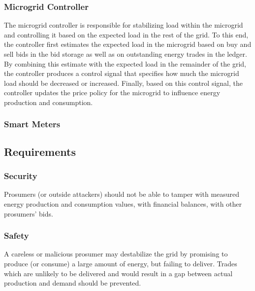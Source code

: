 \subsubsection{Microgrid Controller}
The microgrid controller is responsible for stabilizing load within the microgrid and controlling it based on the expected load in the rest of the grid.
To this end, the controller first estimates the expected load in the microgrid based on buy and sell bids in the bid storage as well as on outstanding energy trades in the ledger.
By combining this estimate with the expected load in the remainder of the grid, the controller produces a control signal that specifies how much the microgrid load should be decreased or increased.
Finally, based on this control signal, the controller updates the price policy for the microgrid to influence energy production and consumption.

\subsubsection{Smart Meters}

\subsection{Requirements}

\subsubsection{Security}
Prosumers (or outside attackers) should not be able to tamper with measured energy production and consumption values, with financial balances, with other prosumers' bids.

\subsubsection{Safety}
A careless or malicious prosumer may destabilize the grid by promising to produce (or consume) a large amount of energy, but failing to deliver.
Trades which are unlikely to be delivered and would result in a gap between actual production and demand should be prevented.

